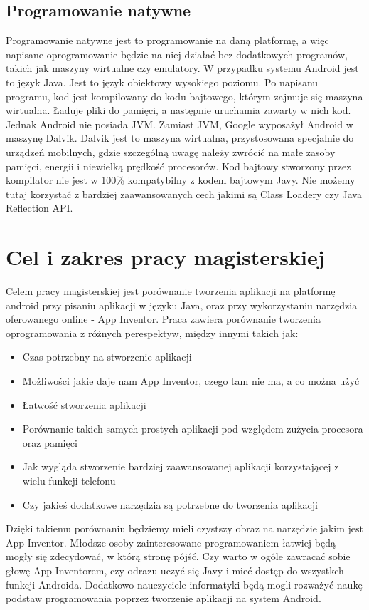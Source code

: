 \subsection{Programowanie natywne}
\label{c112}

Programowanie natywne jest to programowanie na daną platformę, a więc napisane oprogramowanie będzie na niej działać bez dodatkowych programów, takich jak maszyny wirtualne czy emulatory. W przypadku systemu Android jest to język Java. Jest to język obiektowy wysokiego poziomu. Po napisanu programu, kod jest kompilowany do kodu bajtowego, którym zajmuje się maszyna wirtualna. Ładuje pliki do pamięci, a następnie uruchamia zawarty w nich kod. Jednak Android nie posiada JVM. Zamiast JVM, Google wyposażył Android w maszynę Dalvik. Dalvik jest to maszyna wirtualna, przystosowana specjalnie do urządzeń mobilnych, gdzie szczególną uwagę należy zwrócić na małe zasoby pamięci, energii i niewielką prędkość procesorów. Kod bajtowy stworzony przez kompilator nie jest w 100\% kompatybilny z kodem bajtowym Javy. Nie możemy tutaj korzystać z bardziej zaawansowanych cech jakimi są Class Loadery czy Java Reflection API. \cite{gphone:dalvik}

\section{Cel i zakres pracy magisterskiej}
\label{c12}

Celem pracy magisterskiej jest porównanie tworzenia aplikacji na platformę android przy pisaniu aplikacji w języku Java, oraz przy wykorzystaniu narzędzia oferowanego online - App Inventor. Praca zawiera porównanie tworzenia oprogramowania z różnych perespektyw, między innymi takich jak:
\begin{itemize}
\item Czas potrzebny na stworzenie aplikacji
\item Możliwości jakie daje nam App Inventor, czego tam nie ma, a co można użyć
\item Łatwość stworzenia aplikacji 
\item Porównanie takich samych prostych aplikacji pod względem zużycia procesora oraz pamięci
\item Jak wygląda stworzenie bardziej zaawansowanej aplikacji korzystającej z wielu funkcji telefonu
\item Czy jakieś dodatkowe narzędzia są potrzebne do tworzenia aplikacji
\end{itemize}

Dzięki takiemu porównaniu będziemy mieli czystszy obraz na narzędzie jakim jest App Inventor. Młodsze osoby zainteresowane programowaniem łatwiej będą mogły się zdecydować, w którą stronę pójść. Czy warto w ogóle zawracać sobie głowę App Inventorem, czy odrazu uczyć się Javy i mieć dostęp do wszystkch funkcji Androida. Dodatkowo nauczyciele informatyki będą mogli rozważyć naukę podstaw programowania poprzez tworzenie aplikacji na system Android. 

